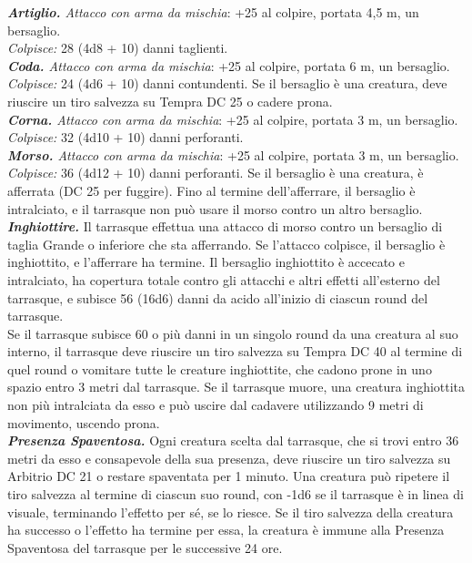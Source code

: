 \begin{multicols}{2}
\emph{\textbf{Artiglio.} Attacco con arma da mischia}: +25 al colpire, portata 4,5 m, un bersaglio.\\
\emph{Colpisce:} 28 (4d8 + 10) danni taglienti. \\
\emph{\textbf{Coda.} Attacco con arma da mischia}: +25 al colpire, portata 6 m, un bersaglio.\\
\emph{Colpisce:} 24 (4d6 + 10) danni contundenti. Se il bersaglio è una creatura, deve riuscire un tiro salvezza su Tempra DC  25 o cadere prona.\\
\emph{\textbf{Corna.} Attacco con arma da mischia}: +25 al colpire, portata 3 m, un bersaglio.\\
\emph{Colpisce:} 32 (4d10 + 10) danni perforanti.\\
\emph{\textbf{Morso.} Attacco con arma da mischia}: +25 al colpire, portata 3 m, un bersaglio.\\
\emph{Colpisce:} 36 (4d12 + 10) danni perforanti. Se il bersaglio è una creatura, è afferrata (DC  25 per fuggire). Fino al termine dell'afferrare, il bersaglio è intralciato, e il tarrasque non può usare il morso contro un altro bersaglio.\\
\emph{\textbf{Inghiottire.}} Il tarrasque effettua una attacco di morso contro un bersaglio di taglia Grande o inferiore che sta afferrando. Se l'attacco colpisce, il bersaglio è inghiottito, e l'afferrare ha termine. Il bersaglio inghiottito è accecato e intralciato, ha copertura totale contro gli attacchi e altri effetti all'esterno del tarrasque, e subisce 56 (16d6) danni da acido all'inizio di ciascun round del tarrasque.\\
Se il tarrasque subisce 60 o più danni in un singolo round da una creatura al suo interno, il tarrasque deve riuscire un tiro salvezza su Tempra DC  40 al termine di quel round o vomitare tutte le creature inghiottite, che cadono prone in uno spazio entro 3 metri dal tarrasque. Se il tarrasque muore, una creatura inghiottita non più intralciata da esso e può uscire dal cadavere utilizzando 9 metri di movimento, uscendo prona.\\
\emph{\textbf{Presenza Spaventosa.}} Ogni creatura scelta dal tarrasque, che si trovi entro 36 metri da esso e consapevole della sua presenza, deve riuscire un tiro salvezza su Arbitrio DC  21 o restare spaventata per 1 minuto. Una creatura può ripetere il tiro salvezza al termine di ciascun suo round, con -1d6 se il tarrasque è in linea di visuale, terminando l'effetto per sé, se lo riesce. Se il tiro salvezza della creatura ha successo o l'effetto ha termine per essa, la creatura è immune alla Presenza Spaventosa del tarrasque per le successive 24 ore.\\

\end{multicols}
